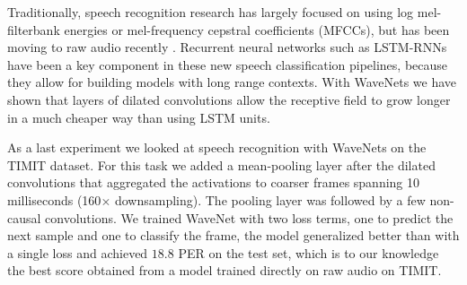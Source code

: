 Traditionally, speech recognition research has largely focused on using log mel-filterbank energies or mel-frequency cepstral coefficients (MFCCs), but has been moving to raw audio recently \citep{palaz2013estimating,tuske2014acoustic,hoshen2015speech,sainath2015learning}. Recurrent neural networks such as LSTM-RNNs \citep{LSTM} have been a key component in these new speech classification pipelines, because they allow for building models with long range contexts. With WaveNets we have shown that layers of dilated convolutions allow the receptive field to grow longer in a much cheaper way than using LSTM units.

As a last experiment we looked at speech recognition with WaveNets on the TIMIT \citep{TIMIT} dataset. For this task we added a mean-pooling layer after the dilated convolutions that aggregated the activations to coarser frames spanning 10 milliseconds (160$\times$ downsampling). The pooling layer was followed by a few non-causal convolutions. We trained WaveNet with two loss terms, one to predict the next sample and one to classify the frame, the model generalized better than with a single loss and achieved $18.8$ PER on the test set, which is to our knowledge the best score obtained from a model trained directly on raw audio on TIMIT.
